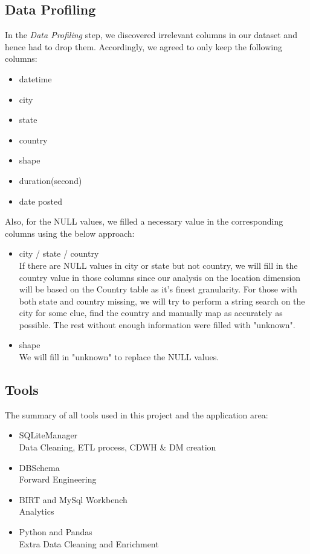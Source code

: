 \documentclass[11pt, journal]{IEEEtran}
\begin{document}
\subsection{Data Profiling}\label{subsec:dataProfiling}
In the \emph{Data Profiling} step, we discovered irrelevant columns in our dataset and hence had to drop them.  Accordingly, we agreed to only keep the following columns:
\begin{itemize}
    \item datetime
    \item city
    \item state
    \item country
    \item shape
    \item duration(second)
    \item date posted
\end{itemize}
Also, for the NULL values, we filled a necessary value in the corresponding columns using the below approach:
\begin{itemize}
    \item city / state / country\\
    If there are NULL values in city or state but not country, we will fill in the country value in those columns since our analysis on the location dimension will be based on the Country table as it's finest granularity. For those with both state and country missing, we will try to perform a string search on the city for some clue, find the country and manually map as accurately as possible. The rest without enough information were filled with "unknown".
    \item shape\\
    We will fill in "unknown" to replace the NULL values.
\end{itemize}

\subsection{Tools}\label{subsec:tools}
The summary of all tools used in this project and the application area:  
\begin{itemize}
    \item SQLiteManager\\
    Data Cleaning, ETL process, CDWH \& DM creation
    \item DBSchema\\
    Forward Engineering
    \item BIRT and MySql Workbench\\
    Analytics
    \item Python and Pandas\\
    Extra Data Cleaning and Enrichment
\end{itemize}
    
\end{document}
